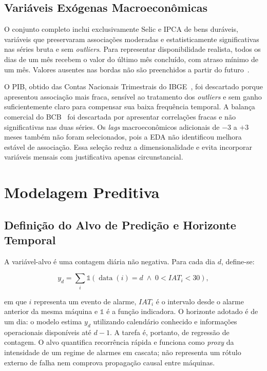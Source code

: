 \subsection{Variáveis Exógenas Macroeconômicas}

O conjunto completo inclui exclusivamente Selic e IPCA de bens duráveis, variáveis que preservaram associações moderadas e estatisticamente significativas nas séries bruta e sem \textit{outliers}. Para representar disponibilidade realista, todos os dias de um mês recebem o valor do último mês concluído, com atraso mínimo de um mês. Valores ausentes nas bordas não são preenchidos a partir do futuro~\cite{bcb_selic_historico,bcb_ipca_duraveis}.

O PIB, obtido das Contas Nacionais Trimestrais do IBGE~\cite{ibge_contas_nacionais_trimestrais}, foi descartado porque apresentou associação mais fraca, sensível ao tratamento dos \textit{outliers} e sem ganho suficientemente claro para compensar sua baixa frequência temporal. A balança comercial do BCB~\cite{bcb_balanca_comercial} foi descartada por apresentar correlações fracas e não significativas nas duas séries. Os \textit{lags} macroeconômicos adicionais de $-3$ a $+3$ meses também não foram selecionados, pois a EDA não identificou melhora estável de associação. Essa seleção reduz a dimensionalidade e evita incorporar variáveis mensais com justificativa apenas circunstancial.

\section{Modelagem Preditiva}
\label{sec:modelagem}

\subsection{Definição do Alvo de Predição e Horizonte Temporal}

A variável-alvo é uma contagem diária não negativa. Para cada dia $d$, define-se:

\begin{equation}
    y_d = \sum_i \mathbb{1}\left(\operatorname{data}(i)=d \;\land\; 0 < IAT_i < 30\right),
    \label{eq:target}
\end{equation}

em que $i$ representa um evento de alarme, $IAT_i$ é o intervalo desde o alarme anterior da mesma máquina e $\mathbb{1}$ é a função indicadora. O horizonte adotado é de um dia: o modelo estima $y_d$ utilizando calendário conhecido e informações operacionais disponíveis até $d-1$. A tarefa é, portanto, de regressão de contagem. O alvo quantifica recorrência rápida e funciona como \textit{proxy} da intensidade de um regime de alarmes em cascata; não representa um rótulo externo de falha nem comprova propagação causal entre máquinas.

